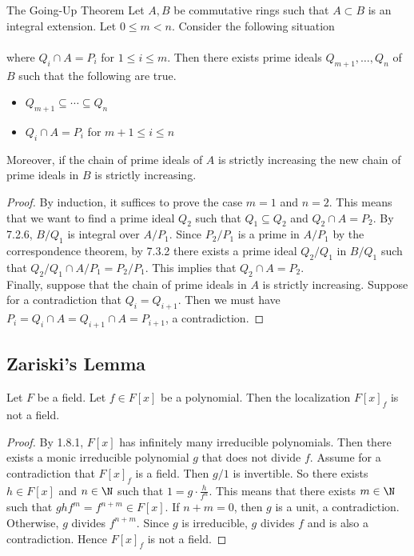 \documentclass[a4paper]{article}
\begin{document}
\begin{thm}{The Going-Up Theorem}{} Let $A,B$ be commutative rings such that $A\subset B$ is an integral extension. Let $0\leq m<n$. Consider the following situation \\
\\
where $Q_i\cap A=P_i$ for $1\leq i\leq m$. Then there exists prime ideals $Q_{m+1},\dots,Q_n$ of $B$ such that the following are true. 
\begin{itemize}
\item $Q_{m+1}\subseteq\cdots\subseteq Q_n$
\item $Q_i\cap A=P_i$ for $m+1\leq i\leq n$
\end{itemize} 
Moreover, if the chain of prime ideals of $A$ is strictly increasing the new chain of prime ideals in $B$ is strictly increasing. 
\begin{proof}
By induction, it suffices to prove the case $m=1$ and $n=2$. This means that we want to find a prime ideal $Q_2$ such that $Q_1\subseteq Q_2$ and $Q_2\cap A=P_2$. By 7.2.6, $B/Q_1$ is integral over $A/P_1$. Since $P_2/P_1$ is a prime in $A/P_1$ by the correspondence theorem, by 7.3.2 there exists a prime ideal $Q_2/Q_1$ in $B/Q_1$ such that $Q_2/Q_1\cap A/P_1=P_2/P_1$. This implies that $Q_2\cap A=P_2$. \\

Finally, suppose that the chain of prime ideals in $A$ is strictly increasing. Suppose for a contradiction that $Q_i=Q_{i+1}$. Then we must have $P_i=Q_i\cap A=Q_{i+1}\cap A=P_{i+1}$, a contradiction. 
\end{proof}
\end{thm}

\subsection{Zariski's Lemma}
\begin{lmm}{}{} Let $F$ be a field. Let $f\in F[x]$ be a polynomial. Then the localization $F[x]_f$ is not a field. 
\begin{proof}
By 1.8.1, $F[x]$ has infinitely many irreducible polynomials. Then there exists a monic irreducible polynomial $g$ that does not divide $f$. Assume for a contradiction that $F[x]_f$ is a field. Then $g/1$ is invertible. So there exists $h\in F[x]$ and $n\in\N$ such that $1=g\cdot\frac{h}{f^n}$. This means that there exists $m\in\N$ such that $ghf^m=f^{n+m}\in F[x]$. If $n+m=0$, then $g$ is a unit, a contradiction. Otherwise, $g$ divides $f^{n+m}$. Since $g$ is irreducible, $g$ divides $f$ and is also a contradiction. Hence $F[x]_f$ is not a field. 
\end{proof}
\end{lmm}
\end{document}
